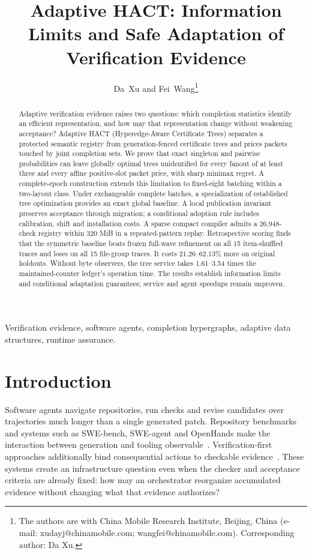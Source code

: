 \documentclass[10pt,journal,compsoc]{IEEEtran}
\title{Adaptive HACT: Information Limits and Safe Adaptation of Verification Evidence}
\author{Da~Xu and Fei~Wang\thanks{The authors are with China Mobile Research Institute, Beijing, China (e-mail: xudayj@chinamobile.com; wangfei@chinamobile.com). Corresponding author: Da Xu.}}
\theoremstyle{definition}\newtheorem{definition}[theorem]{Definition}
\begin{document}
\maketitle
\begin{abstract}
Adaptive verification evidence raises two questions: which completion
statistics identify an efficient representation, and how may that
representation change without weakening acceptance? Adaptive HACT
(Hyperedge-Aware Certificate Trees) separates a protected semantic registry
from generation-fenced certificate trees and prices packets touched by joint
completion sets. We prove that exact singleton and pairwise probabilities
can leave globally optimal trees unidentified for every fanout of at least
three and every affine positive-slot packet price, with sharp minimax
regret. A complete-epoch construction extends this limitation to fixed-eight
batching within a two-layout class. Under exchangeable complete batches, a
specialization of established tree optimization provides an exact global
baseline. A local publication invariant preserves acceptance through
migration; a conditional adoption rule includes calibration, shift and
installation costs. A sparse compact compiler admits a 26,948-check registry within 320 MiB
in a repeated-pattern replay.
Retrospective scoring finds that the symmetric baseline beats frozen
full-wave refinement on all 15 item-shuffled traces and loses on all 15
file-group traces. It costs 21.26--62.13\% more on original holdouts.
Without byte observers, the tree service takes 1.61--3.54 times the
maintained-counter ledger's operation time. The results establish
information limits and conditional adaptation guarantees; service and agent
speedups remain unproven.
\end{abstract}
\begin{IEEEkeywords}
Verification evidence, software agents, completion hypergraphs, adaptive
data structures, runtime assurance.
\end{IEEEkeywords}
\IEEEdisplaynontitleabstractindextext
\IEEEpeerreviewmaketitle

\section{Introduction}
Software agents navigate repositories, run checks and revise candidates
over trajectories much longer than a single generated patch. Repository
benchmarks and systems such as SWE-bench, SWE-agent and OpenHands make
the interaction between generation and tooling observable~\cite{swebench,sweagent,openhands}.
Verification-first approaches additionally bind consequential actions to
checkable evidence~\cite{aiware,traceassurance}. These systems create an
infrastructure question even when the checker and acceptance criteria are
already fixed: how may an orchestrator reorganize accumulated evidence
without changing what that evidence authorizes?
\end{document}
